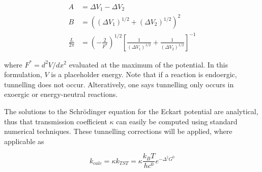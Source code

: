 \begin{align}
  A &= \Delta V_1 - \Delta V_2 \\
  B &= ((\Delta V_1)^{1/2} + (\Delta V_2)^{1/2})^2 \\
 \frac{L}{2\pi} &= (-\frac{2}{F^*})^{1/2} [\frac{1}{(\Delta V_1)^{1/2}} +
      \frac{1}{(\Delta V_2)^{1/2}}]^{-1}
\end{align}

\noindent where $F^* = d^2V/dx^2$ evaluated at the maximum of the potential. In
this formulation, $V$ is a placeholder energy. Note that if a reaction is
endoergic, tunnelling does not occur. Alteratively, one says tunnelling only
occurs in exoergic or energy-neutral reactions.

The solutions to the Schr{\"o}dinger equation for the Eckart potential are
analytical, thus that transmission coefficient $\kappa$ can easily be computed
using standard numerical techniques. These tunnelling corrections will be
applied, where applicable as

\begin{equation}
  k_{calc} = \kappa k_{TST} = \kappa
\frac{k_BT}{hc^0}e^{-\Delta^\ddagger G^0}
\end{equation}


